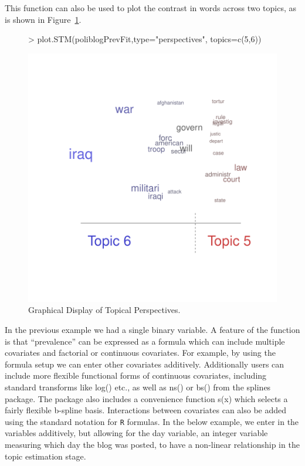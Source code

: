 \documentclass[nojss]{jss}
\begin{document}
This function can also be used to plot the contrast in words across two topics, as is shown in Figure~\ref{fig:perp2}.
\begin{figure}[t!]
\begin{center}
\begin{Schunk}
\begin{Sinput}
> plot.STM(poliblogPrevFit,type="perspectives", topics=c(5,6))
\end{Sinput}
\end{Schunk}
\includegraphics{stmVignette-017}
\caption{Graphical Display of Topical Perspectives.}
\label{fig:perp2}
\end{center}
\end{figure}



In the previous example we had a single binary variable. A feature of the  function is that ``prevalence'' can be expressed as a formula which can include multiple covariates and factorial or continuous covariates.  For example, by using the formula setup we can enter other covariates additively. Additionally users can include more flexible functional forms of continuous covariates, including standard transforms like log() etc., as well as ns() or bs() from the splines package. The  package also includes a convenience function s(x) which selects a fairly flexible b-spline basis. Interactions between covariates can also be added using the standard notation for \texttt{R} formulas. In the below example, we enter in the variables additively, but allowing for the day variable, an integer variable measuring which day the blog was posted, to have a non-linear relationship in the topic estimation stage.
\end{document}
